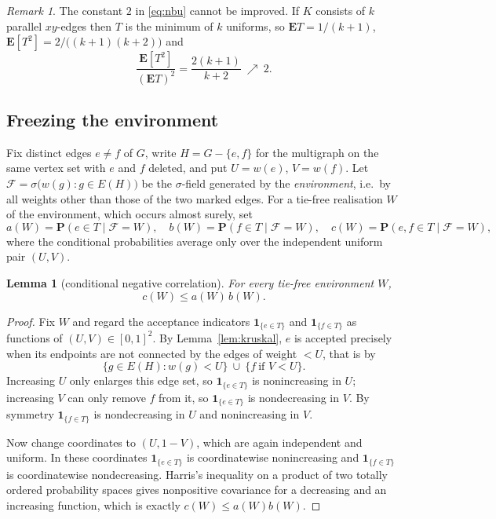 \documentclass[11pt,a4paper]{amsart}
\theoremstyle{plain}
\newtheorem{lemma}[theorem]{Lemma}
\theoremstyle{definition}
\theoremstyle{remark}
\newtheorem{remark}[theorem]{Remark}
\newcommand{\E}{\mathbf{E}}
\newcommand{\PP}{\mathbf{P}}
\begin{document}
\begin{remark}
\label{rem:sharp2}
The constant $2$ in \eqref{eq:nbu} cannot be improved. If $K$ consists of $k$
parallel $xy$-edges then $T$ is the minimum of $k$ uniforms, so $\E T=1/(k+1)$,
$\E[T^2]=2/\bigl((k+1)(k+2)\bigr)$ and
\[
\frac{\E[T^2]}{(\E T)^2}=\frac{2(k+1)}{k+2}\ \nearrow\ 2 .
\]
\end{remark}

\subsection{Freezing the environment}

Fix distinct edges $e\ne f$ of $G$, write $H=G-\{e,f\}$ for the multigraph on the
same vertex set with $e$ and $f$ deleted, and put $U=w(e)$, $V=w(f)$. Let
$\mathcal{F}=\sigma\bigl(w(g):g\in E(H)\bigr)$ be the $\sigma$-field generated by
the \emph{environment}, i.e.\ by all weights other than those of the two marked
edges. For a tie-free realisation $W$ of the environment, which occurs almost
surely, set
\begin{equation}
\label{eq:abc}
a(W)=\PP(e\in T\mid \mathcal F=W),\quad
b(W)=\PP(f\in T\mid \mathcal F=W),\quad
c(W)=\PP(e,f\in T\mid \mathcal F=W),
\end{equation}
where the conditional probabilities average only over the independent uniform
pair $(U,V)$.

\begin{lemma}[conditional negative correlation]
\label{lem:harris}
For every tie-free environment $W$,
\[
c(W)\le a(W)\,b(W).
\]
\end{lemma}

\begin{proof}
Fix $W$ and regard the acceptance indicators
$\mathbf 1_{\{e\in T\}}$ and $\mathbf 1_{\{f\in T\}}$ as functions of
$(U,V)\in[0,1]^2$. By Lemma~\ref{lem:kruskal}, $e$ is accepted precisely when its
endpoints are not connected by the edges of weight $<U$, that is by
\[
\{g\in E(H):w(g)<U\}\ \cup\ \{f\ \text{if } V<U\}.
\]
Increasing $U$ only enlarges this edge set, so $\mathbf 1_{\{e\in T\}}$ is
nonincreasing in $U$; increasing $V$ can only remove $f$ from it, so
$\mathbf 1_{\{e\in T\}}$ is nondecreasing in $V$. By symmetry
$\mathbf 1_{\{f\in T\}}$ is nondecreasing in $U$ and nonincreasing in $V$.

Now change coordinates to $(U,1-V)$, which are again independent and uniform. In
these coordinates $\mathbf 1_{\{e\in T\}}$ is coordinatewise nonincreasing and
$\mathbf 1_{\{f\in T\}}$ is coordinatewise nondecreasing. Harris's inequality
\cite{Harris} on a product of two totally ordered probability spaces gives
nonpositive covariance for a decreasing and an increasing function, which is
exactly $c(W)\le a(W)b(W)$.
\end{proof}
\end{document}
